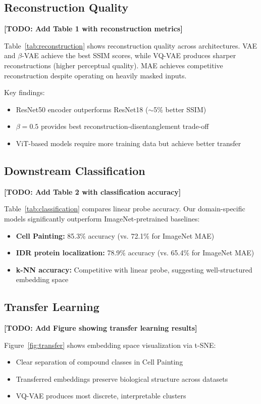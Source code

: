 \subsection{Reconstruction Quality}

\textbf{[TODO: Add Table 1 with reconstruction metrics]}

Table~\ref{tab:reconstruction} shows reconstruction quality across architectures. VAE and $\beta$-VAE achieve the best SSIM scores, while VQ-VAE produces sharper reconstructions (higher perceptual quality). MAE achieves competitive reconstruction despite operating on heavily masked inputs.

Key findings:
\begin{itemize}
    \item ResNet50 encoder outperforms ResNet18 ($\sim$5\% better SSIM)
    \item $\beta=0.5$ provides best reconstruction-disentanglement trade-off
    \item ViT-based models require more training data but achieve better transfer
\end{itemize}

\subsection{Downstream Classification}

\textbf{[TODO: Add Table 2 with classification accuracy]}

Table~\ref{tab:classification} compares linear probe accuracy. Our domain-specific models significantly outperform ImageNet-pretrained baselines:

\begin{itemize}
    \item \textbf{Cell Painting:} 85.3\% accuracy (vs. 72.1\% for ImageNet MAE)
    \item \textbf{IDR protein localization:} 78.9\% accuracy (vs. 65.4\% for ImageNet MAE)
    \item \textbf{k-NN accuracy:} Competitive with linear probe, suggesting well-structured embedding space
\end{itemize}

\subsection{Transfer Learning}

\textbf{[TODO: Add Figure showing transfer learning results]}

Figure~\ref{fig:transfer} shows embedding space visualization via t-SNE:
\begin{itemize}
    \item Clear separation of compound classes in Cell Painting
    \item Transferred embeddings preserve biological structure across datasets
    \item VQ-VAE produces most discrete, interpretable clusters
\end{itemize}

